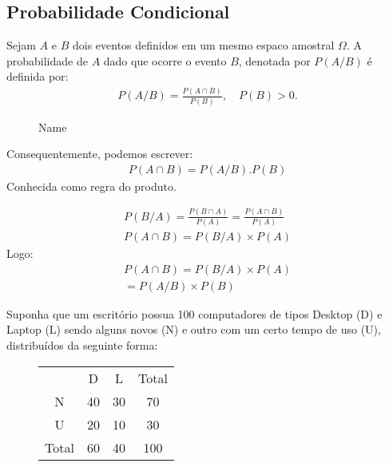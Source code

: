 \begin{description}
\begin{exercise}
\begin{enumerate}[label=(\alph*)]
    \end{enumerate}
  \end{exercise}
    \subsection{Probabilidade Condicional}
    \begin{description}
      \item Sejam $A$ e $B$ dois eventos definidos em um mesmo espaco amostral $\Omega$.
        A probabilidade de $A$  dado que ocorre o evento $B$, denotada por $P(A/B)$ é definida por:
        \begin{align}
          P(A/B)= \frac{P(A\cap B)}{P(B)},  \quad P(B)>0. 
        \end{align}
        \begin{figure}[htpb]
          \centering
          \caption{Name}
          \label{fig:16}
        \end{figure}
        Consequentemente, podemos escrever:
        \begin{align}
          P(A\cap B)= P(A/B).P(B)
        \end{align}
        Conhecida como regra do produto.
        \begin{obs}
        \begin{align}
          P(B/A)= \frac{P(B \cap A)}{P(A)}= \frac{P\left(A\cap B \right)}{P(A)}\\
          P(A \cap B)= P(B/A)\times P(A)
        \end{align}
        Logo:
        \begin{align}
          P(A \cap B) = P(B/A)\times P(A) \\
          =P(A/B)\times P(B)
        \end{align}
      \end{obs}
      \begin{example}
       Suponha que um escritório possua 100 computadores de tipos Desktop (D) e 
        Laptop (L) sendo alguns novos (N) e outro com um certo tempo de uso (U), distribuídos da seguinte forma:
        \begin{figure}[H] 
          \centering
          \begin{tabular}{c c c c}
            \toprule
            &D&L&Total\\ \cmidrule{2-4}
            N&40&30&70\\ \cmidrule{2-4}
            U&20&10&30\\ \cmidrule{2-4}
            Total&60&40&100 \\\bottomrule
          \end{tabular}
          \label{tab:2}
        \end{figure}


\end{example}
\end{description}
\end{description}
